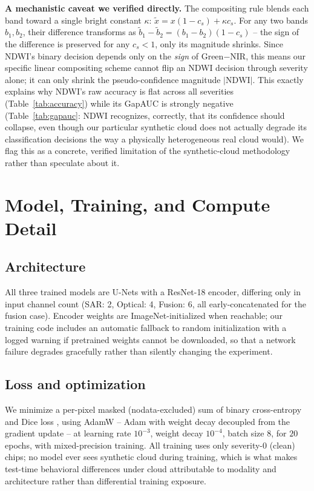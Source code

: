 \documentclass{article}
\begin{document}
\textbf{A mechanistic caveat we verified directly.} The compositing rule blends each band toward a single bright constant $\kappa$: $\tilde x = x(1-c_s) + \kappa c_s$. For any two bands $b_1, b_2$, their difference transforms as $\tilde b_1 - \tilde b_2 = (b_1 - b_2)(1-c_s)$ -- the sign of the difference is preserved for any $c_s < 1$, only its magnitude shrinks. Since NDWI's binary decision depends only on the \emph{sign} of Green$-$NIR, this means our specific linear compositing scheme cannot flip an NDWI decision through severity alone; it can only shrink the pseudo-confidence magnitude $|\mathrm{NDWI}|$. This exactly explains why NDWI's raw accuracy is flat across all severities (Table~\ref{tab:accuracy}) while its GapAUC is strongly negative (Table~\ref{tab:gapauc}: NDWI recognizes, correctly, that its confidence should collapse, even though our particular synthetic cloud does not actually degrade its classification decisions the way a physically heterogeneous real cloud would). We flag this as a concrete, verified limitation of the synthetic-cloud methodology rather than speculate about it.

\section{Model, Training, and Compute Detail}
\label{app:training}

\subsection{Architecture}
All three trained models are U-Nets \citep{ronneberger2015unet} with a ResNet-18 \citep{he2016deep} encoder, differing only in input channel count (SAR: 2, Optical: 4, Fusion: 6, all early-concatenated for the fusion case). Encoder weights are ImageNet-initialized \citep{deng2009imagenet} when reachable; our training code includes an automatic fallback to random initialization with a logged warning if pretrained weights cannot be downloaded, so that a network failure degrades gracefully rather than silently changing the experiment.

\subsection{Loss and optimization}
We minimize a per-pixel masked (nodata-excluded) sum of binary cross-entropy and Dice loss \citep{milletari2016vnet}, using AdamW \citep{loshchilov2019decoupled} -- Adam \citep{kingma2015adam} with weight decay decoupled from the gradient update -- at learning rate $10^{-3}$, weight decay $10^{-4}$, batch size $8$, for $20$ epochs, with mixed-precision training. All training uses only severity-$0$ (clean) chips; no model ever sees synthetic cloud during training, which is what makes test-time behavioral differences under cloud attributable to modality and architecture rather than differential training exposure.
\end{document}
